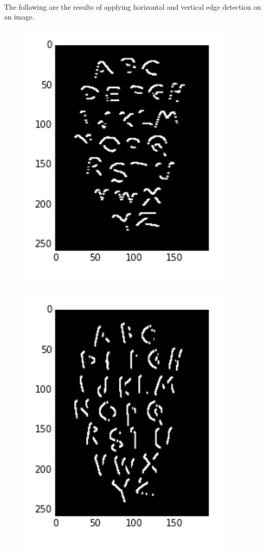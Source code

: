 \documentclass{article}
\begin{document}
		\paragraph{}
		The following are the results of applying horizontal and vertical edge detection on an image.
		\begin{figure}[H]
			\begin{minipage}{.5\textwidth}
				\centering
				\includegraphics[width=0.6\linewidth]{images/vertical_edge_detection.png}
				\label{fig:test4}
			\end{minipage}
			\begin{minipage}{.5\textwidth}
				\centering
				\includegraphics[width=0.6\linewidth]{images/horizontal_edge_detection.png}
				\label{fig:test5}
			\end{minipage}
		\end{figure}
\end{document}
